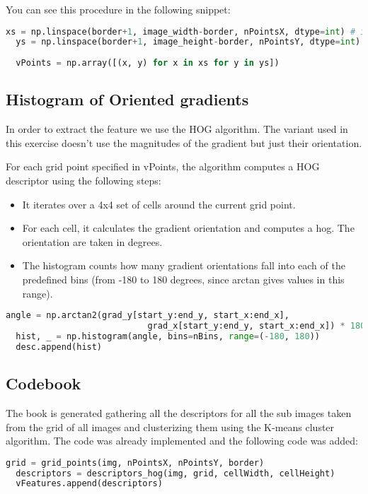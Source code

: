 \documentclass{ETHExercise}
\begin{document}
You can see this procedure in the following snippet:
\begin{lstlisting}[language=Python, caption=Grid creation]
  xs = np.linspace(border+1, image_width-border, nPointsX, dtype=int) # int indices
  ys = np.linspace(border+1, image_height-border, nPointsY, dtype=int) # int indices
  
  vPoints = np.array([(x, y) for x in xs for y in ys])
\end{lstlisting}



\subsection{Histogram of Oriented gradients}
In order to extract the feature we use the HOG algorithm. The variant
used in this exercise doesn't use the magnitudes of the gradient but just
their orientation.

For each grid point specified in vPoints, the algorithm computes a HOG descriptor using the following steps:
\begin{itemize}
  \item It iterates over a 4x4 set of cells around the current grid point.
  \item For each cell, it calculates the gradient orientation and computes a hog. The orientation are taken in degrees.
  \item The histogram counts how many gradient orientations fall into each of the predefined bins (from -180 to 180 degrees, since arctan gives values in this range).
\end{itemize}
\begin{lstlisting}[language=Python, caption=HOG]
  angle = np.arctan2(grad_y[start_y:end_y, start_x:end_x],
                            grad_x[start_y:end_y, start_x:end_x]) * 180 / np.pi           
  hist, _ = np.histogram(angle, bins=nBins, range=(-180, 180))
  desc.append(hist)
\end{lstlisting}


\subsection{Codebook}
The book is generated gathering all the descriptors for all the sub images 
taken from the grid of all images and clusterizing them using the K-means cluster
algorithm. The code was already implemented and the following code
was added:
\begin{lstlisting}[language=Python, caption=Codebook Generation]
  grid = grid_points(img, nPointsX, nPointsY, border)
  descriptors = descriptors_hog(img, grid, cellWidth, cellHeight)
  vFeatures.append(descriptors)
\end{lstlisting}
\end{document}
